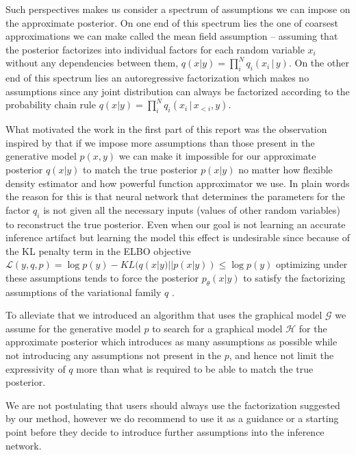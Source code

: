 \documentclass[12pt]{article}
\begin{document}
Such perspectives makes us consider a spectrum of assumptions we can impose on the approximate posterior.
On one end of this spectrum lies the one of coarsest approximations we can make called the mean field assumption -- assuming that the posterior factorizes into individual factors for each random variable $x_i$ without any dependencies between them, $q(x|y)=\prod^N_iq_i(x_i\,|\,y)$.
On the other end of this spectrum lies an autoregressive factorization which makes no assumptions since any joint distribution can always be factorized according to the probability chain rule $q(x|y)=\prod^N_iq_i(x_i\,|\,x_{<i},y)$.

What motivated the work in the first part of this report \citep{Webb2018} was the observation inspired by \citet{StuhlmullerEtAl2013} that if we impose more assumptions than those present in the generative model $p(x,y)$ we can make it impossible for our approximate posterior $q(x|y)$ to match the true posterior $p(x|y)$ no matter how flexible density estimator and how powerful function approximator we use.
In plain words the reason for this is that neural network that determines the parameters for the factor $q_i$ is not given all the necessary inputs (values of other random variables) to reconstruct the true posterior.
Even when our goal is not learning an accurate inference artifact but learning the model this effect is undesirable
since because of the KL penalty term in the ELBO objective
$\mathcal{L}(y,q,p)=\log p(y)-KL(q(x|y) || p(x|y)) \le \log p(y)$ \citep{VAE}
optimizing under these assumptions tends to force the posterior $p_\theta(x|y)$ to satisfy the factorizing assumptions of the variational family $q$ \citep{FIVO}.

To alleviate that we introduced an algorithm that uses the graphical model $\mathcal{G}$ we assume for the generative model $p$ to search for a graphical model $\mathcal{H}$ for the approximate posterior which introduces as many assumptions as possible while not introducing any assumptions not present in the $p$, and hence not limit the expressivity of $q$ more than what is required to be able to match the true posterior.

We are not postulating that users should always use the factorization suggested by our method,
however we do recommend to use it as a guidance or a starting point before they decide to
introduce further assumptions into the inference network.
\end{document}
